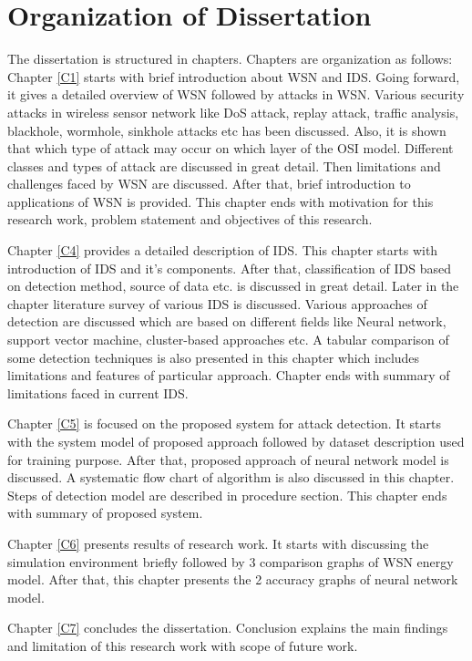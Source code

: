 \section{Organization of Dissertation}
The dissertation is structured in chapters. Chapters are organization as follows:
\\
\noindent Chapter \ref{C1} starts with brief introduction about WSN and IDS. Going forward, it gives a detailed overview of WSN followed by attacks in WSN. Various security attacks in wireless sensor network like DoS attack, replay attack, traffic analysis, blackhole, wormhole, sinkhole attacks etc has been discussed. Also, it is shown that which type of attack may occur on which layer of the OSI model. Different classes and types of attack are discussed in great detail. Then limitations and challenges faced by WSN are discussed. After that, brief introduction to applications of WSN is provided. This chapter ends with motivation for this research work, problem statement and objectives of this research. 
\par Chapter \ref{C4} provides a detailed description of IDS. This chapter starts with introduction of IDS and it's components. After that, classification  of IDS based on detection method, source of data etc. is discussed in great detail. Later in the chapter literature survey of various IDS is discussed. Various approaches of detection are discussed which are based on different fields like Neural network, support vector machine, cluster-based approaches etc. A tabular comparison of some detection techniques is also presented in this chapter which includes limitations and features of particular approach. Chapter ends with summary of limitations faced in current IDS.
\par Chapter \ref{C5} is focused on the proposed system for attack detection. It starts with the system model of proposed approach followed by dataset description used for training purpose. After that, proposed approach of neural network model is discussed. A systematic flow chart of algorithm is also discussed in this chapter. Steps of detection model are described in procedure section. This chapter ends with summary of proposed system.
\par Chapter \ref{C6} presents results of research work. It starts with discussing the simulation environment briefly followed by 3 comparison graphs of WSN energy model. After that, this chapter presents the 2 accuracy graphs of neural network model.
\par Chapter \ref{C7} concludes the dissertation. Conclusion explains the main findings and limitation of this research work with scope of future work.